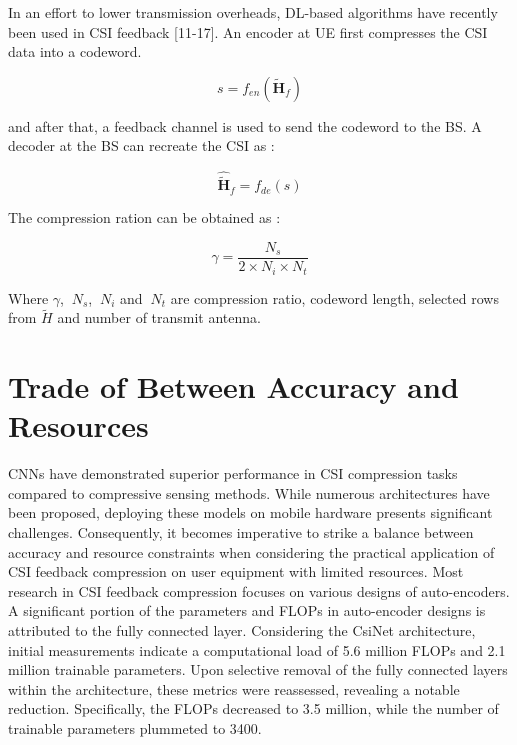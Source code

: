 \documentclass[lettersize,journal]{IEEEtran}
\begin{document}
In an effort to lower transmission overheads, DL-based algorithms have recently been used in CSI feedback [11-17]. An encoder at UE first compresses the CSI data into a codeword.

\begin{equation}
 s=f_{en}(\tilde{\textbf{H}}_{f}) 
\end{equation}

and after that, a feedback channel is used to send the codeword to the BS. A decoder at the BS can recreate the CSI as :

\begin{equation}
\hat{{\tilde{\textbf{H}}}}_{f}=f_{de}(s) 
\end{equation}

The compression ration can be obtained as : 

\begin{equation}
\gamma=\frac{N_{s}}{2\times N_{i}\times N_{t}}  
\end{equation}

Where \begin{math}\gamma \end{math}, \begin{math}\ N_{s} \end{math}, \begin{math}\ N_{i} \end{math} and \begin{math}\ N_{t} \end{math} are compression ratio, codeword length, selected rows from \begin{math}\tilde{H} \end{math} and number of transmit antenna.



\section{Trade of Between Accuracy and Resources} 
CNNs have demonstrated superior performance in CSI compression tasks compared to compressive sensing methods. While numerous architectures have been proposed, deploying these models on mobile hardware presents significant challenges. Consequently, it becomes imperative to strike a balance between accuracy and resource constraints when considering the practical application of CSI feedback compression on user equipment with limited resources.
Most research in CSI feedback compression focuses on various designs of auto-encoders. A significant portion of the parameters and FLOPs in auto-encoder designs is attributed to the fully connected layer. Considering the CsiNet \cite{abe} architecture, initial measurements indicate a computational load of 5.6 million FLOPs and 2.1 million trainable parameters. Upon selective removal of the fully connected layers within the architecture, these metrics were reassessed, revealing a notable reduction. Specifically, the FLOPs decreased to 3.5 million, while the number of trainable parameters plummeted to 3400.
\end{document}

